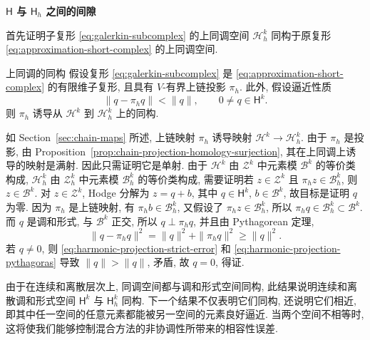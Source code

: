 \medskip\noindent\textbf{{$\mathsf H$ 与 $\mathsf H_h$ 之间的间隙}}\par
{首先证明子复形 \eqref{eq:galerkin-subcomplex} 的上同调空间 $\mathcal H_h^k$ 同构于原复形 \eqref{eq:approximation-short-complex} 的上同调空间.}

\begin{Theorem}{{上同调的同构}}\label{thm:discrete-cohomology-isomorphism}
{假设复形 \eqref{eq:galerkin-subcomplex} 是 \eqref{eq:approximation-short-complex} 的有限维子复形, 且具有 $V$-有界上链投影 $\pi_h$. 此外, 假设逼近性质}
\begin{equation}\label{eq:harmonic-projection-strict-error}
\|q-\pi_hq\|<\|q\|,\qquad0\ne q\in\mathsf H^k.
\end{equation}
{则 $\pi_h$ 诱导从 $\mathcal H^k$ 到 $\mathcal H_h^k$ 上的同构.}
\end{Theorem}

\begin{Proof}
{如 Section~\ref{sec:chain-maps} 所述, 上链映射 $\pi_h$ 诱导映射 $\mathcal H^k\to\mathcal H_h^k$. 由于 $\pi_h$ 是投影, 由 Proposition~\ref{prop:chain-projection-homology-surjection}, 其在上同调上诱导的映射是满射. 因此只需证明它是单射. 由于 $\mathcal H^k$ 由 $\mathcal Z^k$ 中元素模 $\mathcal B^k$ 的等价类构成, $\mathcal H_h^k$ 由 $\mathcal Z_h^k$ 中元素模 $\mathcal B_h^k$ 的等价类构成, 需要证明若 $z\in\mathcal Z^k$ 且 $\pi_hz\in\mathcal B_h^k$, 则 $z\in\mathcal B^k$. 对 $z\in\mathcal Z^k$, Hodge 分解为 $z=q+b$, 其中 $q\in\mathsf H^k$, $b\in\mathcal B^k$, 故目标是证明 $q$ 为零. 因为 $\pi_h$ 是上链映射, 有 $\pi_hb\in\mathcal B_h^k$, 又假设了 $\pi_hz\in\mathcal B_h^k$, 所以 $\pi_hq\in\mathcal B_h^k\subset\mathcal B^k$. 而 $q$ 是调和形式, 与 $\mathcal B^k$ 正交, 所以 $q\perp\pi_hq$, 并且由 Pythagorean 定理,}
\begin{equation}\label{eq:harmonic-projection-pythagoras}
\|q-\pi_hq\|^2=\|q\|^2+\|\pi_hq\|^2\geq\|q\|^2.
\end{equation}
{若 $q\ne0$, 则 \eqref{eq:harmonic-projection-strict-error} 和 \eqref{eq:harmonic-projection-pythagoras} 导致 $\|q\|>\|q\|$, 矛盾, 故 $q=0$, 得证.}
\end{Proof}

{由于在连续和离散层次上, 同调空间都与调和形式空间同构, 此结果说明连续和离散调和形式空间 $\mathsf H^k$ 与 $\mathsf H_h^k$ 同构. 下一个结果不仅表明它们同构, 还说明它们相近, 即其中任一空间的任意元素都能被另一空间的元素良好逼近. 当两个空间不相等时, 这将使我们能够控制混合方法的非协调性所带来的相容性误差.}

